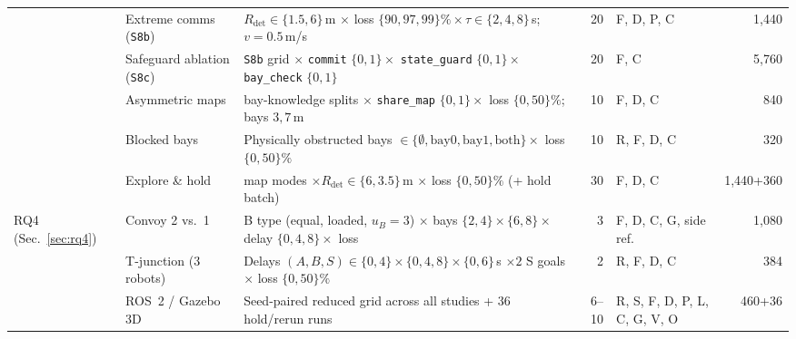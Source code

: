 \begin{table}[!t]
{\begin{tabular}{@{}ll>{\raggedright\arraybackslash}p{}rlr@{}}
 & Extreme comms (\texttt{S8b}) & $R_{\mathrm{det}}\in\{1.5,6\}$\,m $\times$ loss $\{90,97,99\}\%\times\tau\in\{2,4,8\}$\,s; $v=0.5$\,m/s & 20 & F, D, P, C & 1,440 \\
 & Safeguard ablation (\texttt{S8c}) & \texttt{S8b} grid $\times$ \texttt{commit} $\{0,1\}\times$ \texttt{state\_guard} $\{0,1\}\times$ \texttt{bay\_check} $\{0,1\}$ & 20 & F, C & 5,760 \\
 & Asymmetric maps & 7 bay-knowledge splits $\times$ \texttt{share\_map} $\{0,1\}\times$ loss $\{0,50\}\%$; bays $3,7$\,m & 10 & F, D, C & 840 \\
 & Blocked bays & Physically obstructed bays $\in\{\emptyset,\text{bay0},\text{bay1},\text{both}\}\times$ loss $\{0,50\}\%$ & 10 & R, F, D, C & 320 \\
 & Explore \& hold & 4 map modes $\times R_{\mathrm{det}}\in\{6,3.5\}$\,m $\times$ loss $\{0,50\}\%$ (+ hold batch) & 30 & F, D, C & 1,440+360 \\\midrule
\multirow{3}{*}{RQ4 (Sec.~\ref{sec:rq4})}
 & Convoy 2 vs.\ 1 & B type (equal, loaded, $u_B=3$) $\times$ bays $\{2,4\}\times\{6,8\}\times$ delay $\{0,4,8\}\times$ loss & 3 & F, D, C, G, side ref. & 1,080 \\
 & T-junction (3 robots) & Delays $(A,B,S)\in\{0,4\}\times\{0,4,8\}\times\{0,6\}$\,s $\times 2$ S goals $\times$ loss $\{0,50\}\%$ & 2 & R, F, D, C & 384 \\
 & ROS~2 / Gazebo 3D & Seed-paired reduced grid across all studies + 36 hold/rerun runs & 6--10 & R, S, F, D, P, L, C, G, V, O & 460+36 \\\bottomrule
\end{tabular}}
\end{table}

